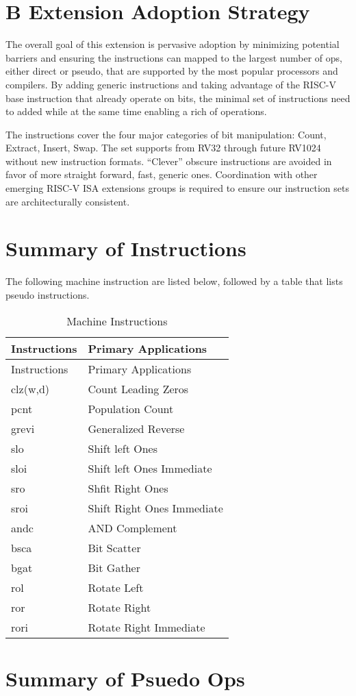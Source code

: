 \section{B Extension Adoption
Strategy}\label{b-extension-adoption-strategy}

The overall goal of this extension is pervasive adoption by minimizing
potential barriers and ensuring the instructions can mapped to the
largest number of ops, either direct or pseudo, that are supported by
the most popular processors and compilers. By adding generic
instructions and taking advantage of the RISC-V base instruction that
already operate on bits, the minimal set of instructions need to added
while at the same time enabling a rich of operations.

The instructions cover the four major categories of bit manipulation:
Count, Extract, Insert, Swap. The set supports from RV32 through future
RV1024 without new instruction formats. ``Clever'' obscure instructions
are avoided in favor of more straight forward, fast, generic ones.
Coordination with other emerging RISC-V ISA extensions groups is
required to ensure our instruction sets are architecturally consistent.

\section{Summary of Instructions}\label{summary-of-instructions}

The following machine instruction are listed below, followed by a table
that lists pseudo instructions.

\begin{longtable}[c]{@{}ll@{}}
\caption{Machine Instructions}\tabularnewline
\toprule
Instructions & Primary Applications\tabularnewline
\midrule
\endfirsthead
\toprule
Instructions & Primary Applications\tabularnewline
\midrule
\endhead
clz(w,d) & Count Leading Zeros\tabularnewline
pcnt & Population Count\tabularnewline
grevi & Generalized Reverse\tabularnewline
slo & Shift left Ones\tabularnewline
sloi & Shift left Ones Immediate\tabularnewline
sro & Shfit Right Ones\tabularnewline
sroi & Shift Right Ones Immediate\tabularnewline
andc & AND Complement\tabularnewline
bsca & Bit Scatter\tabularnewline
bgat & Bit Gather\tabularnewline
rol & Rotate Left\tabularnewline
ror & Rotate Right\tabularnewline
rori & Rotate Right Immediate\tabularnewline
\bottomrule
\end{longtable}

\section{Summary of Psuedo Ops}\label{summary-of-psuedo-ops}

